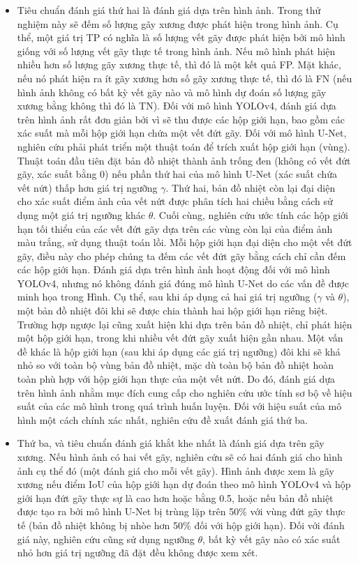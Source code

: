 \documentclass[../the.tex]{subfiles}
\begin{document}
{\begin{itemize}
  \item Tiêu chuẩn đánh giá thứ hai là đánh giá dựa trên hình ảnh. Trong thử nghiệm này sẽ đếm số lượng gãy xương được phát hiện trong hình ảnh. Cụ thể, một giá trị TP có nghĩa là số lượng vết gãy được phát hiện bởi mô hình giống với số lượng vết gãy thực tế trong hình ảnh. Nếu mô hình phát hiện nhiều hơn số lượng gãy xương thực tế, thì đó là một kết quả FP. Mặt khác, nếu nó phát hiện ra ít gãy xương hơn số gãy xương thực tế, thì đó là FN (nếu hình ảnh không có bất kỳ vết gãy nào và mô hình dự đoán số lượng gãy xương bằng không thì đó là TN). Đối với mô hình YOLOv4, đánh giá dựa trên hình ảnh rất đơn giản bởi vì sẽ thu được các hộp giới hạn, bao gồm các xác suất mà mỗi hộp giới hạn chứa một vết đứt gãy. Đối với mô hình U-Net, nghiên cứu phải phát triển một thuật toán để trích xuất hộp giới hạn (vùng). Thuật toán đầu tiên đặt bản đồ nhiệt thành ảnh trống đen (không có vết đứt gãy, xác suất bằng 0) nếu phần thứ hai của mô hình U-Net (xác suất chứa vết nứt) thấp hơn giá trị ngưỡng $\gamma$. Thứ hai, bản đồ nhiệt còn lại đại diện cho xác suất điểm ảnh của vết nứt được phân tích hai chiều bằng cách sử dụng một giá trị ngưỡng khác $\theta$. Cuối cùng, nghiên cứu ước tính các hộp giới hạn tối thiểu của các vết đứt gãy dựa trên các vùng còn lại của điểm ảnh màu trắng, sử dụng thuật toán lồi\cite{10.1145/235815.235821}. Mỗi hộp giới hạn đại diện cho một vết đứt gãy, điều này cho phép chúng ta đếm các vết đứt gãy bằng cách chỉ cần đếm các hộp giới hạn. Đánh giá dựa trên hình ảnh hoạt động đối với mô hình YOLOv4, nhưng nó không đánh giá đúng mô hình U-Net do các vấn đề được minh họa trong Hình. Cụ thể, sau khi áp dụng cả hai giá trị ngưỡng ($\gamma$ và $\theta$), một bản đồ nhiệt đôi khi sẽ được chia thành hai hộp giới hạn riêng biệt. Trường hợp ngược lại cũng xuất hiện khi dựa trên bản đồ nhiệt, chỉ phát hiện một hộp giới hạn, trong khi nhiều vết đứt gãy xuất hiện gần nhau. Một vấn đề khác là hộp giới hạn (sau khi áp dụng các giá trị ngưỡng) đôi khi sẽ khá nhỏ so với toàn bộ vùng bản đồ nhiệt, mặc dù toàn bộ bản đồ nhiệt hoàn toàn phù hợp với hộp giới hạn thực của một vết nứt. Do đó, đánh giá dựa trên hình ảnh nhằm mục đích cung cấp cho nghiên cứu ước tính sơ bộ về hiệu suất của các mô hình trong quá trình huấn luyện. Đối với hiệu suất của mô hình một cách chính xác nhất, nghiên cứu đề xuất đánh giá thứ ba.
   
  \item Thứ ba, và tiêu chuẩn đánh giá khắt khe nhất là đánh giá dựa trên gãy xương. Nếu hình ảnh có hai vết gãy, nghiên cứu sẽ có hai đánh giá cho hình ảnh cụ thể đó (một đánh giá cho mỗi vết gãy). Hình ảnh được xem là gãy xương nếu điểm IoU của hộp giới hạn dự đoán theo mô hình YOLOv4 và hộp giới hạn đứt gãy thực sự là cao hơn hoặc bằng 0.5, hoặc nếu bản đồ nhiệt được tạo ra bởi mô hình U-Net bị trùng lặp trên 50\% với vùng đứt gãy thực tế (bản đồ nhiệt không bị nhòe hơn 50\% đối với hộp giới hạn). Đối với đánh giá này, nghiên cứu cũng sử dụng ngưỡng $\theta$, bất kỳ vết gãy nào có xác suất nhỏ hơn giá trị ngưỡng đã đặt đều không được xem xét.


\end{itemize}}
\end{document}
